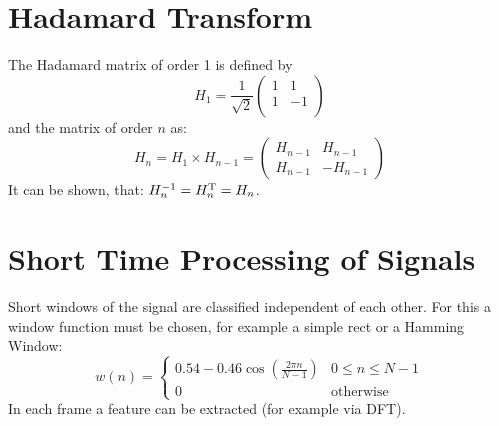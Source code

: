 \section{Hadamard Transform}
The Hadamard matrix of order 1 is defined by
\begin{equation*}
    H_1 = \frac{1}{\sqrt{2}}
        \begin{pmatrix}
            1 & 1 \\
            1 & -1 \\
        \end{pmatrix}
\end{equation*}
and the matrix of order $n$ as:
\begin{equation*}
    H_n = H_1 \times H_{n-1} =
        \begin{pmatrix}
            H_{n-1} & H_{n-1} \\
            H_{n-1} & -H_{n-1}
        \end{pmatrix}
\end{equation*}
It can be shown, that: $H_n^{-1} = H_n^\text{T} = H_n$.

\section{Short Time Processing of Signals}
Short windows of the signal are classified independent of each other. For this a window function must be chosen, for example a simple rect or a Hamming Window:
\begin{equation*}
    w(n) = 
        \begin{cases}
            0.54-0.46 \cos\left( \frac{2 \pi n}{N-1}\right) & 0 \leq n \leq N-1 \\
            0 & \text{otherwise}
        \end{cases}
\end{equation*}
In each frame a feature can be extracted (for example via DFT).

